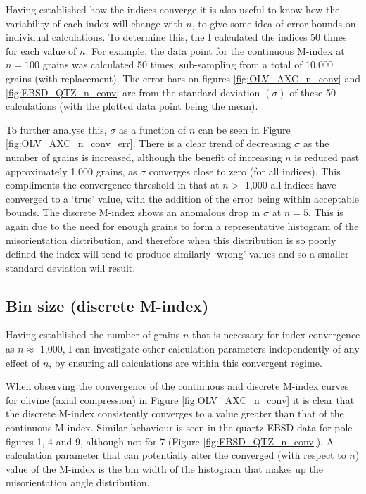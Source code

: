 \documentclass[a4paper,12pt,twoside]{report}
\numberwithin{equation}{chapter}
\begin{document}
Having established how the indices converge it is also useful to know how the variability of each index will change with $n$, to give some idea of error bounds on individual calculations. To determine this, the I calculated the indices 50 times for each value of $n$. For example, the data point for the continuous M-index at $n = 100$ grains was calculated 50 times, sub-sampling from a total of 10,000 grains (with replacement). The error bars on figures \ref{fig:OLV_AXC_n_conv} and \ref{fig:EBSD_QTZ_n_conv} are from the standard deviation $(\sigma)$ of these 50 calculations (with the plotted data point being the mean).

To further analyse this, $\sigma$ as a function of $n$ can be seen in Figure \ref{fig:OLV_AXC_n_conv_err}. There is a clear trend of decreasing $\sigma$ as the number of grains is increased, although the benefit of increasing $n$ is reduced past approximately 1,000 grains, as $\sigma$ converges close to zero (for all indices). This compliments the convergence threshold in that at $n >$ 1,000 all indices have converged to a \lq{}true\rq{} value, with the addition of the error being within acceptable bounds. The discrete M-index shows an anomalous drop in $\sigma$ at $n = 5$. This is again due to the need for enough grains to form a representative histogram of the misorientation distribution, and therefore when this distribution is so poorly defined the index will tend to produce similarly \lq{}wrong\rq{} values and so a smaller standard deviation will result.

\subsection{Bin size (discrete M-index)} \label{sec:bin_size}

Having established the number of grains $n$ that is necessary for index convergence as $n \approx$ 1,000, I can investigate other calculation parameters independently of any effect of $n$, by ensuring all calculations are within this convergent regime. 

When observing the convergence of the continuous and discrete M-index curves for olivine (axial compression) in Figure \ref{fig:OLV_AXC_n_conv} it is clear that the discrete M-index consistently converges to a value greater than that of the continuous M-index. Similar behaviour is seen in the quartz EBSD data for pole figures 1, 4 and 9, although not for 7 (Figure \ref{fig:EBSD_QTZ_n_conv}). A calculation parameter that can potentially alter the converged (with respect to $n$) value of the M-index is the bin width of the histogram that makes up the misorientation angle distribution.   
\end{document}
